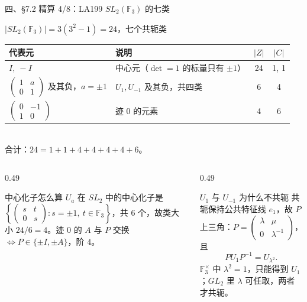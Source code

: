\documentclass[aspectratio=169,10pt,fontset=none]{ctexbeamer}
\begin{document}
\begin{frame}[t]{四、\S7.2 精算 4/8：LA199 $SL_2(\mathbb F_3)$ 的七类}
  \begin{block}{$|SL_2(\mathbb F_3)|=3(3^2-1)=24$，七个共轭类}
    \scriptsize
    \renewcommand{\arraystretch}{1.15}
    \begin{tabular}{@{}l l c c@{}}
      \toprule
      代表元 & 说明 & $|Z|$ & $|C|$\\
      \midrule
      $I,\ -I$ & 中心元（$\det=1$ 的标量只有 $\pm1$） & 24 & 1, 1\\
      $\begin{pmatrix}1&a\\0&1\end{pmatrix}$ 及其负，$a=\pm1$ & $U_1,U_{-1}$ 及其负，共四类 & 6 & 4\\
      $\begin{pmatrix}0&-1\\1&0\end{pmatrix}$ & 迹 $0$ 的元素 & 4 & 6\\
      \bottomrule
    \end{tabular}\\[1pt]
    合计：$24=1+1+4+4+4+4+6$。
  \end{block}
  \begin{columns}[T,onlytextwidth]
    \begin{column}{0.49\textwidth}
      \begin{block}{\footnotesize 中心化子怎么算}
        \scriptsize
        $U_a$ 在 $SL_2$ 中的中心化子是 $\left\{\begin{pmatrix}s&t\\0&s\end{pmatrix}:s=\pm1,\ t\in\mathbb F_3\right\}$，共 $6$ 个，故类大小 $24/6=4$。迹 $0$ 的 $A$ 与 $P$ 交换 $\iff P\in\{\pm I,\pm A\}$，阶 $4$。
      \end{block}
    \end{column}
    \begin{column}{0.49\textwidth}
      \begin{alertblock}{\footnotesize $U_1$ 与 $U_{-1}$ 为什么不共轭}
        \scriptsize
        共轭保持公共特征线 $e_1$，故 $P$ 上三角：$P=\begin{pmatrix}\lambda&\mu\\0&\lambda^{-1}\end{pmatrix}$，且
        \[ P U_1 P^{-1}=U_{\lambda^2}. \]
        $\mathbb F_3^\times$ 中 $\lambda^2=1$，只能得到 $U_1$；$GL_2$ 里 $\lambda$ 可任取，两者才共轭。
      \end{alertblock}
    \end{column}
  \end{columns}
\end{frame}
\end{document}
